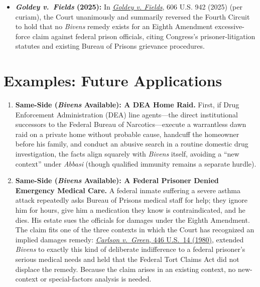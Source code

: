 \documentclass[12pt]{article}
\begin{document}
\begin{itemize}
\item \textbf{\textit{Goldey v.\ Fields} (2025):} In \href{https://supreme.justia.com/cases/federal/us/606/24-809/}{\textit{Goldey v. Fields}}, 606 U.S. 942 (2025) (per curiam), the Court unanimously and summarily reversed the Fourth Circuit to hold that no \textit{Bivens} remedy exists for an Eighth Amendment excessive-force claim against federal prison officials, citing Congress's prisoner-litigation statutes and existing Bureau of Prisons grievance procedures.

\end{itemize}

\section{Examples: Future Applications}
\begin{enumerate}

\item \textbf{Same-Side (\textit{Bivens} Available): A DEA Home Raid.} First, if Drug Enforcement Administration (DEA) line agents---the direct institutional successors to the Federal Bureau of Narcotics---execute a warrantless dawn raid on a private home without probable cause, handcuff the homeowner before his family, and conduct an abusive search in a routine domestic drug investigation, the facts align squarely with \textit{Bivens} itself, avoiding a ``new context'' under \textit{Abbasi} (though qualified immunity remains a separate hurdle).

\item \textbf{Same-Side (\textit{Bivens} Available): A Federal Prisoner Denied Emergency Medical Care.} A federal inmate suffering a severe asthma attack repeatedly asks Bureau of Prisons medical staff for help; they ignore him for hours, give him a medication they know is contraindicated, and he dies. His estate sues the officials for damages under the Eighth Amendment. The claim fits one of the three contexts in which the Court has recognized an implied damages remedy: \href{https://supreme.justia.com/cases/federal/us/446/14/}{\textit{Carlson v.\ Green}, 446 U.S.\ 14 (1980)}, extended \textit{Bivens} to exactly this kind of deliberate indifference to a federal prisoner's serious medical needs and held that the Federal Tort Claims Act did not displace the remedy. Because the claim arises in an existing context, no new-context or special-factors analysis is needed.


\end{enumerate}
\end{document}
